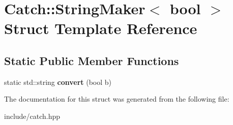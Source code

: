\hypertarget{structCatch_1_1StringMaker_3_01bool_01_4}{}\section{Catch\+:\+:String\+Maker$<$ bool $>$ Struct Template Reference}
\label{structCatch_1_1StringMaker_3_01bool_01_4}
\subsection*{Static Public Member Functions}
\begin{DoxyCompactItemize}
\item 
static std\+::string {\bfseries convert} (bool b)\hypertarget{structCatch_1_1StringMaker_3_01bool_01_4_a37e9899c82c4b4515f876f16f8957a77}{}\label{structCatch_1_1StringMaker_3_01bool_01_4_a37e9899c82c4b4515f876f16f8957a77}

\end{DoxyCompactItemize}


The documentation for this struct was generated from the following file\+:\begin{DoxyCompactItemize}
\item 
include/catch.\+hpp\end{DoxyCompactItemize}
